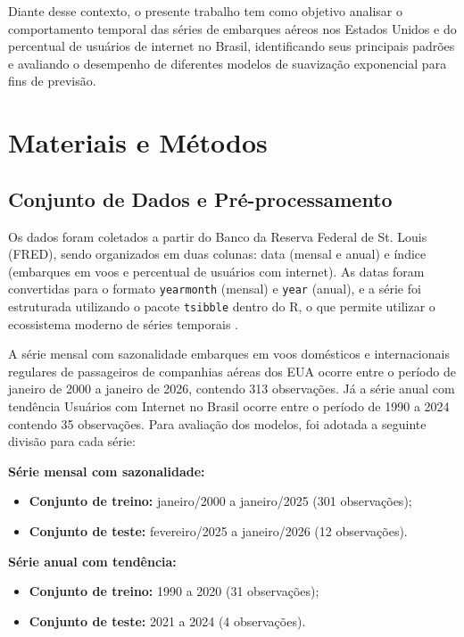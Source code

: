 \documentclass[12pt, a4paper]{article}
\newcommand{\pkg}[1]{\texttt{#1}}
\begin{document}
Diante desse contexto, o presente trabalho tem como objetivo analisar o comportamento temporal das séries de embarques aéreos nos Estados Unidos e do percentual de usuários de internet no Brasil, identificando seus principais padrões e avaliando o desempenho de diferentes modelos de suavização exponencial para fins de previsão.

\section{Materiais e Métodos}
\label{sec:metodos}

\subsection{Conjunto de Dados e Pré-processamento}

Os dados foram coletados a partir do Banco da Reserva Federal de St. Louis (FRED)\cite{fred}, sendo organizados em duas colunas: data (mensal e anual) e índice (embarques em voos e percentual de usuários com internet). As datas
foram convertidas para o formato \texttt{yearmonth} (mensal) e \texttt{year} (anual), e a série foi
estruturada utilizando o pacote \pkg{tsibble} dentro do R, o que permite utilizar o ecossistema moderno de séries temporais \citep{wang2020tsibble}.

A série mensal com sazonalidade embarques em voos domésticos e internacionais regulares de passageiros de companhias aéreas dos EUA\cite{fred_enplane} ocorre entre o período de janeiro de 2000 a janeiro de 2026, contendo 313 observações. Já a série anual com tendência Usuários com Internet no Brasil\cite{fred_internet} ocorre entre o período de 1990 a 2024 contendo 35 observações. Para avaliação dos modelos, foi adotada a seguinte divisão para cada série:

\textbf{Série mensal com sazonalidade:}
\begin{itemize}
  \item \textbf{Conjunto de treino:} janeiro/2000 a janeiro/2025
        (301 observações);
  \item \textbf{Conjunto de teste:} fevereiro/2025 a janeiro/2026
        (12 observações).
\end{itemize}

\textbf{Série anual com tendência:}
\begin{itemize}
  \item \textbf{Conjunto de treino:} 1990 a 2020
      (31 observações);
  \item \textbf{Conjunto de teste:} 2021 a 2024
        (4 observações).
\end{itemize}
\end{document}
